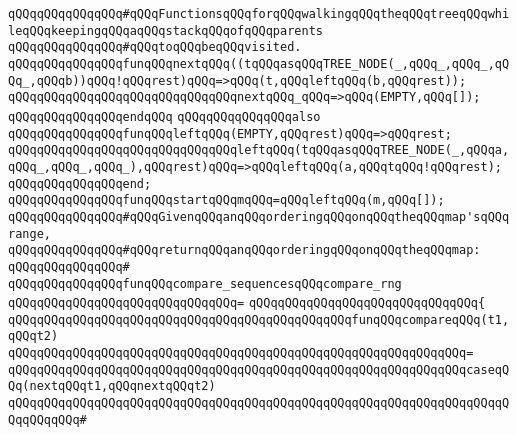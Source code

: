\newline
\verb|qQQqqQQqqQQqqQQq#qQQqFunctionsqQQqforqQQqwalkingqQQqtheqQQqtreeqQQqwhileqQQqkeepingqQQqaqQQqstackqQQqofqQQqparents|\newline
\verb|qQQqqQQqqQQqqQQq#qQQqtoqQQqbeqQQqvisited.|\newline
\newline
\verb|qQQqqQQqqQQqqQQqfunqQQqnextqQQq((tqQQqasqQQqTREE_NODE(_,qQQq_,qQQq_,qQQq_,qQQqb))qQQq!qQQqrest)qQQq=>qQQq(t,qQQqleftqQQq(b,qQQqrest));|\newline
\verb|qQQqqQQqqQQqqQQqqQQqqQQqqQQqqQQqnextqQQq_qQQq=>qQQq(EMPTY,qQQq[]);|\newline
\verb|qQQqqQQqqQQqqQQqendqQQq|\newline
\newline
\verb|qQQqqQQqqQQqqQQqalso|\newline
\verb|qQQqqQQqqQQqqQQqfunqQQqleftqQQq(EMPTY,qQQqrest)qQQq=>qQQqrest;|\newline
\verb|qQQqqQQqqQQqqQQqqQQqqQQqqQQqqQQqleftqQQq(tqQQqasqQQqTREE_NODE(_,qQQqa,qQQq_,qQQq_,qQQq_),qQQqrest)qQQq=>qQQqleftqQQq(a,qQQqtqQQq!qQQqrest);|\newline
\verb|qQQqqQQqqQQqqQQqend;|\newline
\newline
\verb|qQQqqQQqqQQqqQQqfunqQQqstartqQQqmqQQq=qQQqleftqQQq(m,qQQq[]);|\newline
\newline
\verb|qQQqqQQqqQQqqQQq#qQQqGivenqQQqanqQQqorderingqQQqonqQQqtheqQQqmap'sqQQqrange,|\newline
\verb|qQQqqQQqqQQqqQQq#qQQqreturnqQQqanqQQqorderingqQQqonqQQqtheqQQqmap:|\newline
\verb|qQQqqQQqqQQqqQQq#|\newline
\verb|qQQqqQQqqQQqqQQqfunqQQqcompare_sequencesqQQqcompare_rng|\newline
\verb|qQQqqQQqqQQqqQQqqQQqqQQqqQQqqQQq=|\newline
\verb|qQQqqQQqqQQqqQQqqQQqqQQqqQQqqQQq{|\newline
\verb|qQQqqQQqqQQqqQQqqQQqqQQqqQQqqQQqqQQqqQQqqQQqqQQqfunqQQqcompareqQQq(t1,qQQqt2)|\newline
\verb|qQQqqQQqqQQqqQQqqQQqqQQqqQQqqQQqqQQqqQQqqQQqqQQqqQQqqQQqqQQqqQQq=|\newline
\verb|qQQqqQQqqQQqqQQqqQQqqQQqqQQqqQQqqQQqqQQqqQQqqQQqqQQqqQQqqQQqqQQqcaseqQQq(nextqQQqt1,qQQqnextqQQqt2)|\newline
\verb|qQQqqQQqqQQqqQQqqQQqqQQqqQQqqQQqqQQqqQQqqQQqqQQqqQQqqQQqqQQqqQQqqQQqqQQqqQQqqQQq#|\newline
